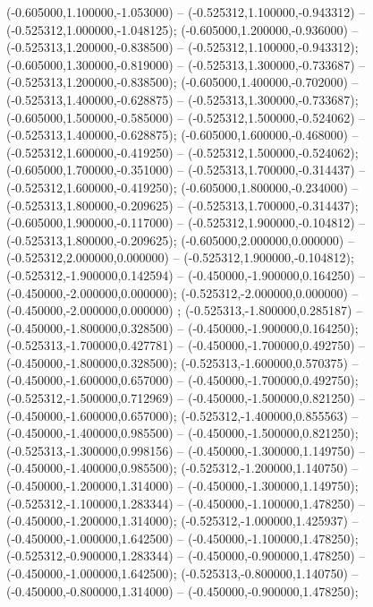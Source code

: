  (-0.605000,1.100000,-1.053000) -- (-0.525312,1.100000,-0.943312) -- (-0.525312,1.000000,-1.048125);
 (-0.605000,1.200000,-0.936000) -- (-0.525313,1.200000,-0.838500) -- (-0.525312,1.100000,-0.943312);
 (-0.605000,1.300000,-0.819000) -- (-0.525313,1.300000,-0.733687) -- (-0.525313,1.200000,-0.838500);
 (-0.605000,1.400000,-0.702000) -- (-0.525313,1.400000,-0.628875) -- (-0.525313,1.300000,-0.733687);
 (-0.605000,1.500000,-0.585000) -- (-0.525312,1.500000,-0.524062) -- (-0.525313,1.400000,-0.628875);
 (-0.605000,1.600000,-0.468000) -- (-0.525312,1.600000,-0.419250) -- (-0.525312,1.500000,-0.524062);
 (-0.605000,1.700000,-0.351000) -- (-0.525313,1.700000,-0.314437) -- (-0.525312,1.600000,-0.419250);
 (-0.605000,1.800000,-0.234000) -- (-0.525313,1.800000,-0.209625) -- (-0.525313,1.700000,-0.314437);
 (-0.605000,1.900000,-0.117000) -- (-0.525312,1.900000,-0.104812) -- (-0.525313,1.800000,-0.209625);
 (-0.605000,2.000000,0.000000) -- (-0.525312,2.000000,0.000000) -- (-0.525312,1.900000,-0.104812);
 (-0.525312,-1.900000,0.142594) -- (-0.450000,-1.900000,0.164250) -- (-0.450000,-2.000000,0.000000);
 (-0.525312,-2.000000,0.000000) -- (-0.450000,-2.000000,0.000000) ;
 (-0.525313,-1.800000,0.285187) -- (-0.450000,-1.800000,0.328500) -- (-0.450000,-1.900000,0.164250);
 (-0.525313,-1.700000,0.427781) -- (-0.450000,-1.700000,0.492750) -- (-0.450000,-1.800000,0.328500);
 (-0.525313,-1.600000,0.570375) -- (-0.450000,-1.600000,0.657000) -- (-0.450000,-1.700000,0.492750);
 (-0.525312,-1.500000,0.712969) -- (-0.450000,-1.500000,0.821250) -- (-0.450000,-1.600000,0.657000);
 (-0.525312,-1.400000,0.855563) -- (-0.450000,-1.400000,0.985500) -- (-0.450000,-1.500000,0.821250);
 (-0.525313,-1.300000,0.998156) -- (-0.450000,-1.300000,1.149750) -- (-0.450000,-1.400000,0.985500);
 (-0.525312,-1.200000,1.140750) -- (-0.450000,-1.200000,1.314000) -- (-0.450000,-1.300000,1.149750);
 (-0.525312,-1.100000,1.283344) -- (-0.450000,-1.100000,1.478250) -- (-0.450000,-1.200000,1.314000);
 (-0.525312,-1.000000,1.425937) -- (-0.450000,-1.000000,1.642500) -- (-0.450000,-1.100000,1.478250);
 (-0.525312,-0.900000,1.283344) -- (-0.450000,-0.900000,1.478250) -- (-0.450000,-1.000000,1.642500);
 (-0.525313,-0.800000,1.140750) -- (-0.450000,-0.800000,1.314000) -- (-0.450000,-0.900000,1.478250);
